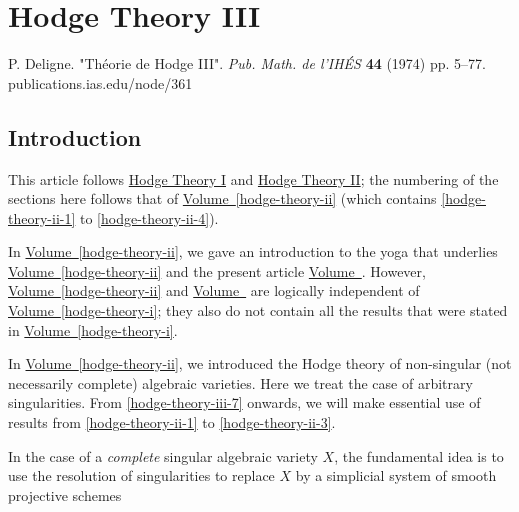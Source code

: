 \part{Hodge Theory III}\label{hodge-theory-iii}\thispagestyle{fancy}\par{}P. Deligne.
  "Théorie de Hodge III".
  \emph{Pub. Math. de l'IHÉS} \textbf{44} (1974) pp. 5–77.
  publications.ias.edu/node/361\chapter{Introduction}\thispagestyle{fancy}\label{hodge-theory-iii-introduction}\par{}This article follows \hyperref[hodge-theory-i]{Hodge Theory I} and \hyperref[hodge-theory-ii]{Hodge Theory II};
  the numbering of the sections here follows that of \hyperref[hodge-theory-ii]{Volume~\ref*{hodge-theory-ii}} (which contains \cref{hodge-theory-ii-1} to \cref{hodge-theory-ii-4}).\par{}In \hyperref[hodge-theory-ii]{Volume~\ref*{hodge-theory-ii}}, we gave an introduction to the yoga that underlies \hyperref[hodge-theory-ii]{Volume~\ref*{hodge-theory-ii}} and the present article \hyperref[hodge-theory-iii]{Volume~\ref*{hodge-theory-iii}}.
  However, \hyperref[hodge-theory-ii]{Volume~\ref*{hodge-theory-ii}} and \hyperref[hodge-theory-iii]{Volume~\ref*{hodge-theory-iii}} are logically independent of \hyperref[hodge-theory-i]{Volume~\ref*{hodge-theory-i}};
  they also do not contain all the results that were stated in \hyperref[hodge-theory-i]{Volume~\ref*{hodge-theory-i}}.\par{}In \hyperref[hodge-theory-ii]{Volume~\ref*{hodge-theory-ii}}, we introduced the Hodge theory of non-singular (not necessarily complete) algebraic varieties.
  Here we treat the case of arbitrary singularities.
  From \cref{hodge-theory-iii-7} onwards, we will make essential use of results from \cref{hodge-theory-ii-1} to \cref{hodge-theory-ii-3}.\par{}In the case of a \emph{complete} singular algebraic variety \(X\), the fundamental idea is to use the resolution of singularities to replace \(X\) by a simplicial system of smooth projective schemes
  

